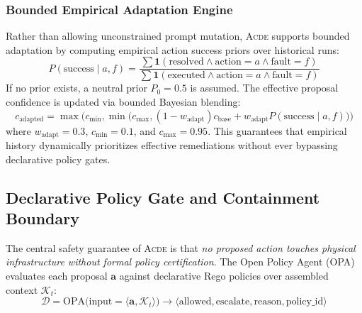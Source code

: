 \subsubsection{Bounded Empirical Adaptation Engine}
Rather than allowing unconstrained prompt mutation, \textsc{Acde} supports bounded adaptation by computing empirical action success priors over historical runs:
\begin{equation}
P(\text{success} \mid a, f) = \frac{\sum \mathbf{1}(\text{resolved} \land \text{action}=a \land \text{fault}=f)}{\sum \mathbf{1}(\text{executed} \land \text{action}=a \land \text{fault}=f)}
\label{eq:prior}
\end{equation}
If no prior exists, a neutral prior $P_0 = 0.5$ is assumed. The effective proposal confidence is updated via bounded Bayesian blending:
\begin{equation}
c_{\text{adapted}} = \max\Big(c_{\min}, \min\big(c_{\max}, (1 - w_{\text{adapt}}) c_{\text{base}} + w_{\text{adapt}} P(\text{success} \mid a, f)\big)\Big)
\label{eq:blend}
\end{equation}
where $w_{\text{adapt}} = 0.3$, $c_{\min} = 0.1$, and $c_{\max} = 0.95$. This guarantees that empirical history dynamically prioritizes effective remediations without ever bypassing declarative policy gates.

\subsection{Declarative Policy Gate and Containment Boundary}
\label{subsec:policy}

The central safety guarantee of \textsc{Acde} is that \emph{no proposed action touches physical infrastructure without formal policy certification}. The Open Policy Agent (OPA) evaluates each proposal $\mathbf{a}$ against declarative Rego policies over assembled context $\mathcal{K}_t$:
\begin{equation}
\mathcal{D} = \text{OPA}\big(\text{input} = \langle \mathbf{a}, \mathcal{K}_t \rangle\big) \rightarrow \langle \text{allowed}, \text{escalate}, \text{reason}, \text{policy\_id} \rangle
\end{equation}

